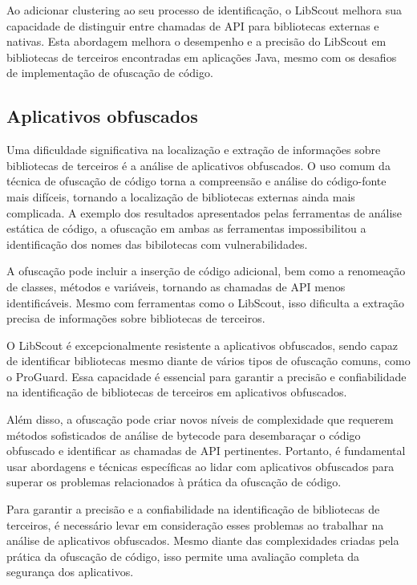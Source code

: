 Ao adicionar clustering ao seu processo de identificação, o LibScout melhora sua capacidade de distinguir entre chamadas de API para bibliotecas externas e nativas. Esta abordagem melhora o desempenho e a precisão do LibScout em bibliotecas de terceiros encontradas em aplicações Java, mesmo com os desafios de implementação de ofuscação de código.

\subsection{Aplicativos obfuscados} %

Uma dificuldade significativa na localização e extração de informações sobre bibliotecas de terceiros é a análise de aplicativos obfuscados. O uso comum da técnica de ofuscação de código torna a compreensão e análise do código-fonte mais difíceis, tornando a localização de bibliotecas externas ainda mais complicada. A exemplo dos resultados apresentados pelas ferramentas de análise estática de código, a ofuscação em ambas as ferramentas impossibilitou a identificação dos nomes das bibilotecas com vulnerabilidades.

A ofuscação pode incluir a inserção de código adicional, bem como a renomeação de classes, métodos e variáveis, tornando as chamadas de API menos identificáveis. Mesmo com ferramentas como o LibScout, isso dificulta a extração precisa de informações sobre bibliotecas de terceiros.

O LibScout é excepcionalmente resistente a aplicativos obfuscados, sendo capaz de identificar bibliotecas mesmo diante de vários tipos de ofuscação comuns, como o ProGuard. Essa capacidade é essencial para garantir a precisão e confiabilidade na identificação de bibliotecas de terceiros em aplicativos obfuscados.

Além disso, a ofuscação pode criar novos níveis de complexidade que requerem métodos sofisticados de análise de bytecode para desembaraçar o código obfuscado e identificar as chamadas de API pertinentes. Portanto, é fundamental usar abordagens e técnicas específicas ao lidar com aplicativos obfuscados para superar os problemas relacionados à prática da ofuscação de código.

Para garantir a precisão e a confiabilidade na identificação de bibliotecas de terceiros, é necessário levar em consideração esses problemas ao trabalhar na análise de aplicativos obfuscados. Mesmo diante das complexidades criadas pela prática da ofuscação de código, isso permite uma avaliação completa da segurança dos aplicativos.


